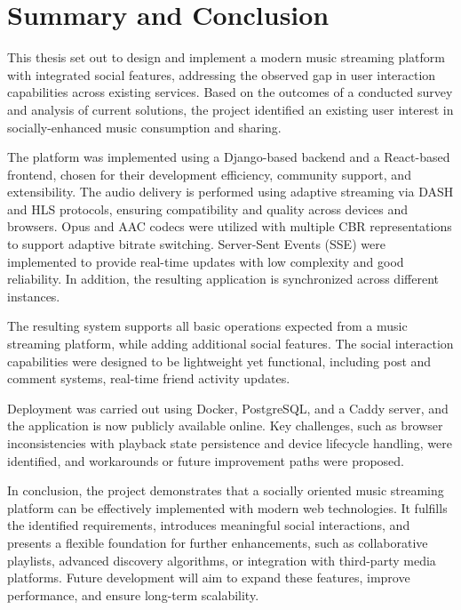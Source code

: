 \chapter{Summary and Conclusion}\label{ch:conclusion}
This thesis set out to design and implement a modern music streaming platform
with integrated social features, addressing the observed gap
in user interaction capabilities across existing services. Based on the outcomes of
a conducted survey and analysis of current solutions, the project identified
an existing user interest in socially-enhanced music consumption and sharing.

The platform was implemented using a Django-based backend and a React-based frontend,
chosen for their development efficiency, community support, and extensibility.
The audio delivery is performed using adaptive streaming via DASH and HLS protocols,
ensuring compatibility and quality across devices and browsers.
Opus and AAC codecs were utilized with multiple CBR representations to support adaptive bitrate
switching. Server-Sent Events (SSE) were implemented to provide real-time
updates with low complexity and good reliability. In addition,
the resulting application is synchronized across different instances.

The resulting system supports all basic operations expected from a music streaming platform,
while adding additional social features.
The social interaction capabilities were designed to be lightweight yet functional,
including post and comment systems, real-time friend activity updates.

Deployment was carried out using Docker, PostgreSQL, and a Caddy server,
and the application is now publicly available online.
Key challenges, such as browser inconsistencies with playback state persistence
and device lifecycle handling, were identified, and workarounds
or future improvement paths were proposed.

In conclusion, the project demonstrates that a socially oriented music streaming
platform can be effectively implemented with modern web technologies.
It fulfills the identified requirements, introduces meaningful social
interactions, and presents a flexible foundation for further enhancements,
such as collaborative playlists, advanced discovery algorithms,
or integration with third-party media platforms.
Future development will aim to expand these features,
improve performance, and ensure long-term scalability.


